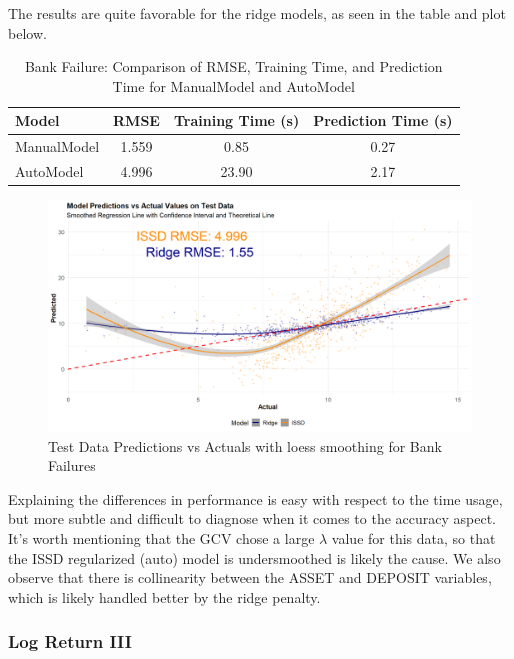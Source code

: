 \documentclass[12pt, twoside,hidelinks]{article}
\theoremstyle{definition}
\numberwithin{equation}{section}
\begin{document}
The results are quite favorable for the ridge models, as seen in the table and plot below. 
 
\begin{table}[H]
\centering
\begin{tabular}{lccc}
\toprule
\textbf{Model} & \textbf{RMSE} & \textbf{Training Time (s)} & \textbf{Prediction Time (s)} \\
\midrule
ManualModel & 1.559 & 0.85 & 0.27 \\
AutoModel   & 4.996 & 23.90 & 2.17 \\
\bottomrule
\end{tabular}
\caption{Bank Failure: Comparison of RMSE, Training Time, and Prediction Time for ManualModel and AutoModel}
\label{tab:model_comparison}
\end{table}

\begin{figure}[H]
\includegraphics[width=\textwidth]{visuals/ridge/loess_ridge_issd_new.png}
\caption{Test Data Predictions vs Actuals with loess smoothing for Bank Failures}
\label{loess_bank_ridge}
\end{figure}

Explaining the differences in performance is easy with respect to the time usage, but more subtle and difficult to diagnose when it comes to the accuracy aspect. It's worth mentioning that the GCV chose a large $\lambda$ value for this data, so that the ISSD regularized (auto) model is undersmoothed is likely the cause. We also observe that there is collinearity between the ASSET and DEPOSIT variables, which is likely handled better by the ridge penalty. 

\subsubsection{Log Return III}\label{sec:ridge:wind_model_ridge}
\end{document}
